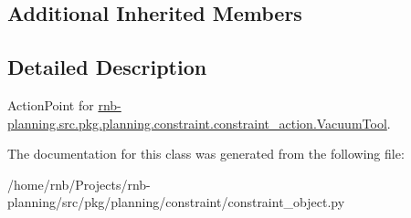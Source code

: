 \subsection*{Additional Inherited Members}


\subsection{Detailed Description}
Action\+Point for \hyperlink{classrnb-planning_1_1src_1_1pkg_1_1planning_1_1constraint_1_1constraint__action_1_1_vacuum_tool}{rnb-\/planning.\+src.\+pkg.\+planning.\+constraint.\+constraint\+\_\+action.\+Vacuum\+Tool}. 

The documentation for this class was generated from the following file\+:\begin{DoxyCompactItemize}
\item 
/home/rnb/\+Projects/rnb-\/planning/src/pkg/planning/constraint/constraint\+\_\+object.\+py\end{DoxyCompactItemize}
